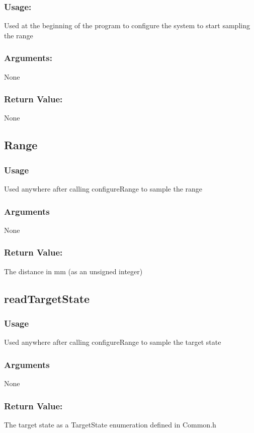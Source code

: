 \documentclass[]{report}
\begin{document}
\subsubsection{Usage:}
Used at the beginning of the program to configure the system to start sampling the range

\subsubsection{Arguments:}
None

\subsubsection{Return Value:}
None

\subsection{Range}
\subsubsection{Usage}
Used anywhere after calling configureRange to sample the range

\subsubsection{Arguments}
None

\subsubsection{Return Value:}
The distance in mm (as an unsigned integer)

\subsection{readTargetState}
\subsubsection{Usage}
Used anywhere after calling configureRange to sample the target state

\subsubsection{Arguments}
None

\subsubsection{Return Value:}
The target state as a TargetState enumeration defined in Common.h
\end{document}
